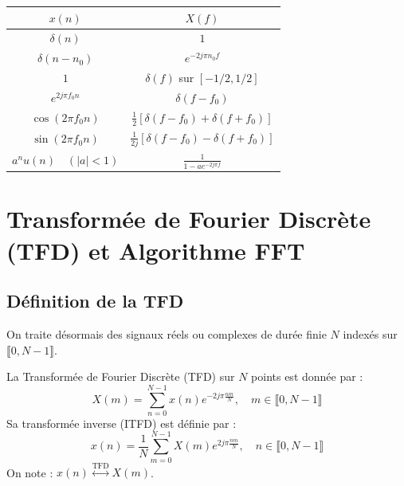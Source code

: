 \begin{proposition}
    \begin{center}
        \renewcommand{\arraystretch}{1.6}
        \begin{tabular}{cc}
            \toprule
            $x(n)$ & $X(f)$ \\
            \midrule
            $\delta(n)$ & $1$ \\
            $\delta(n - n_0)$ & $e^{-2j\pi n_0 f}$ \\
            $1$ & $\delta(f)$ sur $[-1/2, 1/2]$ \\
            $e^{2j \pi f_0 n}$ & $\delta(f - f_0)$ \\
            $\cos(2\pi f_0 n)$ & $\frac{1}{2} [\delta(f - f_0) + \delta(f + f_0)]$ \\
            $\sin(2\pi f_0 n)$ & $\frac{1}{2j} [\delta(f - f_0) - \delta(f + f_0)]$ \\
            $a^n u(n) \quad (|a| < 1)$ & $\displaystyle \frac{1}{1 - a e^{-2j \pi f}}$ \\
            \bottomrule
        \end{tabular}
    \end{center}
\end{proposition}


\section{Transformée de Fourier Discrète (TFD) et Algorithme FFT}

\subsection{Définition de la TFD}

On traite désormais des signaux réels ou complexes de durée finie $N$ indexés sur $\llbracket 0, N-1 \rrbracket$.

\begin{definition}
    La Transformée de Fourier Discrète (TFD) sur $N$ points est donnée par :
        \begin{equation}
            \boxed{X(m) = \sum_{n=0}^{N-1} x(n) e^{-2j \pi \frac{n m}{N}}, \quad m \in \llbracket 0, N-1 \rrbracket}
        \end{equation}
    Sa transformée inverse (ITFD) est définie par :
        \begin{equation}
            \boxed{x(n) = \frac{1}{N} \sum_{m=0}^{N-1} X(m) e^{2j \pi \frac{n m}{N}}, \quad n \in \llbracket 0, N-1 \rrbracket}
        \end{equation}
    On note : $x(n) \overset{\text{TFD}}{\longleftrightarrow} X(m)$.
\end{definition}

